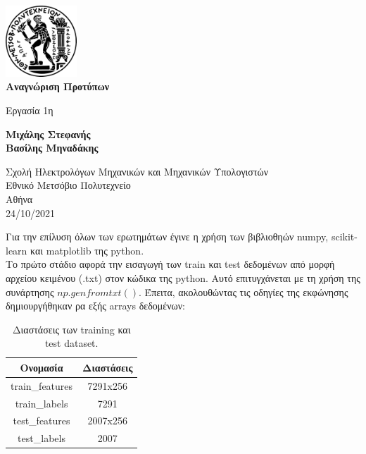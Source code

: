 \documentclass[11pt]{article} %
\begin{document}
\begin{titlepage}
    \begin{center}
        \vspace*{1cm}
	\includegraphics[width=0.2\textwidth]{plots/ntua_logo}\\    
	\vspace*{1cm}
        \Huge
        \textbf{Αναγνώριση Προτύπων}
            
        \vspace{0.5cm}
        \LARGE
        Εργασία 1η
            
        \vspace{1.5cm}
        
        \textbf{Μιχάλης Στεφανής}\\    
        \textbf{Βασίλης Μηναδάκης}
            
        \vfill
                        
        \vspace{0.8cm}
            
        
            
        \Large
        Σχολή Ηλεκτρολόγων Μηχανικών και Μηχανικών Υπολογιστών\\
        Εθνικό Μετσόβιο Πολυτεχνείο\\
        Αθήνα\\
        24/10/2021
            
    \end{center}
\end{titlepage}

Για την επίλυση όλων των ερωτημάτων έγινε η χρήση των βιβλιοθηών numpy, scikit-learn και matplotlib της python.\\
Το πρώτο στάδιο αφορά την εισαγωγή των train και test δεδομένων από μορφή αρχείου κειμένου (.txt) στον κώδικα της python. Αυτό επιτυγχάνεται με τη χρήση της συνάρτησης $np.genfromtxt()$. Έπειτα, ακολουθώντας τις οδηγίες της εκφώνησης δημιουργήθηκαν ρα εξής arrays δεδομένων:

\begin{table}[h]
\begin{center}
\begin{tabular}{c c }
\hline\hline
Ονομασία & Διαστάσεις \\
\hline
train\_features & 7291x256\\ 
train\_labels     & 7291      \\  
test\_features  & 2007x256\\
test\_labels      & 2007\\
\hline 
\end{tabular}
\caption{Διαστάσεις των training και test dataset.}
\end{center}
\end{table}
\end{document}
